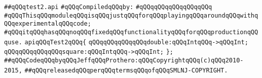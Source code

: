 \label{src/app/makelib/test/test2.api}
\verb|##qQQqtest2.api|\newline
\newline
\verb|#qQQqCompiledqQQqby:|\newline
\verb|#qQQqqQQqqQQqqQQqqQQq|\newline
\newline
\newline
\newline
\verb|#qQQqThisqQQqmoduleqQQqisqQQqjustqQQqforqQQqplayingqQQqaroundqQQqwithqQQqexperimentalqQQqcode;|\newline
\verb|#qQQqitqQQqhasqQQqnoqQQqfixedqQQqfunctionalityqQQqforqQQqproductionqQQquse.|\newline
\newline
\newline
\newline
\verb|apiqQQqTest2qQQq{|\newline
\newline
\verb|qQQqqQQqqQQqqQQqdouble:qQQqIntqQQq->qQQqInt;|\newline
\verb|qQQqqQQqqQQqqQQqsquare:qQQqIntqQQq->qQQqInt;|\newline
\newline
\verb|};|\newline
\newline
\newline
\verb|##qQQqCodeqQQqbyqQQqJeffqQQqProthero:qQQqCopyrightqQQq(c)qQQq2010-2015,|\newline
\verb|##qQQqreleasedqQQqperqQQqtermsqQQqofqQQqSMLNJ-COPYRIGHT.|\newline

